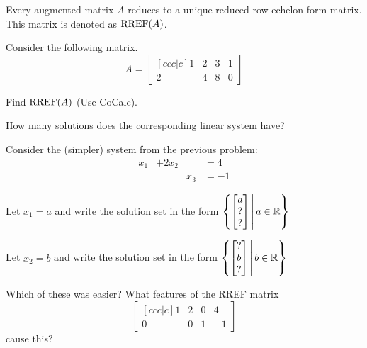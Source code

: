 \begin{applicationActivities}{2}{4}

\begin{fact}
  Every augmented matrix \(A\) reduces to a unique reduced row echelon form
  matrix. This matrix is denoted as \(\operatorname{RREF}(A)\).
\end{fact}

\begin{activity}{10}
  Consider the following matrix.
  \[
    A = \begin{bmatrix}[ccc|c]
      1 & 2 & 3 & 1\\
      2 & 4 & 8 & 0
    \end{bmatrix}
  \]
  \begin{subactivity}
    Find \(\operatorname{RREF}(A)\) (Use CoCalc).
  \end{subactivity}
  \begin{subactivity}
    How many solutions does the corresponding linear system have?
  \end{subactivity}
\end{activity}

\begin{activity}{10}
Consider the (simpler) system from the previous problem:
	\begin{alignat*}{3}
		x_1 &+ 2x_2 & &= 4\\
	     	 & &x_3 &= -1
	\end{alignat*}
\begin{subactivity}
Let $x_1=a$ and write the solution set in the form 
\( \left\{ \begin{bmatrix} a \\ ? \\ ? \end{bmatrix} \,\middle|\, a \in \mathbb{R} \right\} \)
\end{subactivity}
\begin{subactivity}
Let $x_2=b$ and write the solution set in the form 
\( \left\{ \begin{bmatrix} ? \\ b \\ ? \end{bmatrix} \,\middle|\, b \in \mathbb{R} \right\} \)
\end{subactivity}
\begin{subactivity}
Which of these was easier?  What features of the RREF matrix \[\begin{bmatrix}[ccc|c] 1 & 2 & 0 & 4 \\ 0 & 0 & 1 & -1 \end{bmatrix}\] cause this?
\end{subactivity}
\end{activity}


\end{applicationActivities}
